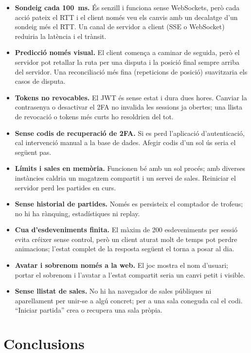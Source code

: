 \documentclass[11pt,a4paper]{article}
\begin{document}
\begin{itemize}
  \item \textbf{Sondeig cada 100~ms.} És senzill i funciona sense WebSockets, però cada
        acció pateix el RTT i el client només veu els canvis amb un decalatge d'un
        sondeig més el RTT\@. Un canal de servidor a client (SSE o WebSocket) reduiria
        la latència i el trànsit.
  \item \textbf{Predicció només visual.} El client comença a caminar de seguida, però el
        servidor pot retallar la ruta per una disputa i la posició final sempre arriba
        del servidor. Una reconciliació més fina (repeticions de posició) suavitzaria els
        casos de disputa.
  \item \textbf{Tokens no revocables.} El JWT és sense estat i dura dues hores. Canviar
        la contrasenya o desactivar el 2FA no invalida les sessions ja obertes; una
        llista de revocació o tokens més curts ho resoldrien del tot.
  \item \textbf{Sense codis de recuperació de 2FA.} Si es perd l'aplicació
        d'autenticació, cal intervenció manual a la base de dades. Afegir codis d'un
        sol ús seria el següent pas.
  \item \textbf{Límits i sales en memòria.} Funcionen bé amb un sol procés; amb diverses
        instàncies caldria un magatzem compartit i un servei de sales. Reiniciar el
        servidor perd les partides en curs.
  \item \textbf{Sense historial de partides.} Només es persisteix el comptador de
        trofeus; no hi ha rànquing, estadístiques ni replay.
  \item \textbf{Cua d'esdeveniments finita.} El màxim de 200 esdeveniments per sessió
        evita créixer sense control, però un client aturat molt de temps pot perdre
        animacions; l'estat complet de la resposta següent el torna a posar al dia.
  \item \textbf{Avatar i sobrenom només a la web.} El joc mostra el nom d'usuari;
        portar el sobrenom i l'avatar a l'estat compartit seria un canvi petit i
        visible.
  \item \textbf{Sense llistat de sales.} No hi ha navegador de sales públiques ni
        aparellament per unir-se a algú concret; per a una sala coneguda cal el codi.
        \enquote{Iniciar partida} crea o recupera una sala pròpia.
\end{itemize}

\section{Conclusions}
\label{sec:conclusions}
\end{document}
